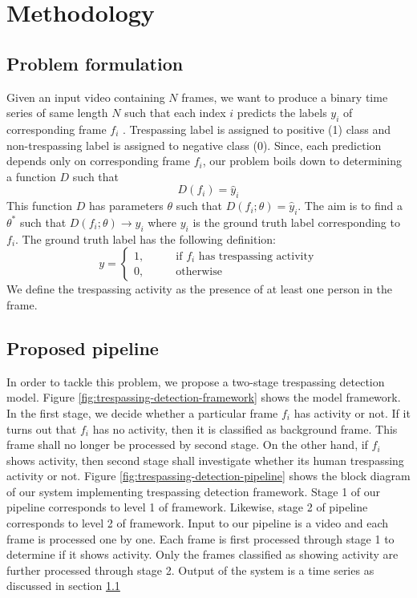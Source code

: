 \section{Methodology}
\subsection{Problem formulation}
\label{sec:prob-formulation}
Given an input video containing $N$ frames, we want to produce a binary time series of same length $N$ such that each index $i$ predicts the labels $y_i$ of corresponding frame $f_i$ . Trespassing label is assigned to positive (1) class and non-trespassing label is assigned to negative class (0). Since, each prediction depends only on corresponding frame $f_i$, our problem boils down to determining a function $D$ such that 
$$ D(f_i) = \hat{y}_i $$
This function $D$ has parameters $\theta$ such that $D(f_i;\theta) = \hat{y}_i$. The aim is to find a $\theta^*$ such that $D(f_i;\theta) \rightarrow y_i$ where $y_i$ is the ground truth label corresponding to $f_i$. The ground truth label has the following definition: 
$$y=
\begin{cases}
1,  &\qquad \textrm{if } f_i \textrm{ has trespassing activity} \\ 
0, 	&\qquad \textrm{otherwise}
\end{cases}
$$
We define the trespassing activity as the presence of at  least one person in the frame. 




\subsection{Proposed pipeline} 
In order to tackle this problem, we propose a two-stage trespassing detection model. Figure \ref{fig:trespassing-detection-framework} shows the model framework. In the first stage, we decide whether a particular frame $f_i$ has activity or not. If it turns out that $f_i$ has no activity, then it is classified as background frame. This frame shall no longer be processed by second stage. On the other hand, if $f_i$ shows activity, then second stage shall investigate whether its human trespassing activity or not. Figure \ref{fig:trespassing-detection-pipeline} shows the block diagram of our system implementing trespassing detection framework. Stage 1 of our pipeline corresponds to level 1 of framework. Likewise, stage 2 of pipeline corresponds to level 2 of framework. Input to our pipeline is a video and each frame is processed one by one. Each frame is first processed through stage 1 to determine if it shows activity. Only the frames classified as showing activity are further processed through stage 2. Output of the system is a time series as discussed in section \ref{sec:prob-formulation}  

